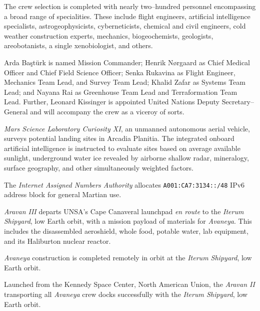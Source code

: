 The crew selection is completed with nearly two--hundred personnel encompassing a broad range of specialities. These include flight engineers, artificial intelligence specialists, astrogeophysicists, cyberneticists, chemical and civil engineers, cold weather construction experts, mechanics, biogeochemists, geologists, areobotanists, a single xenobiologist, and others.

Arda Baştürk is named Mission Commander; Henrik Nørgaard as Chief Medical Officer and Chief Field Science Officer; Senka Rukavina as Flight Engineer, Mechanics Team Lead, and Survey Team Lead; Khalid Zafar as Systems Team Lead; and Nayana Rai as Greenhouse Team Lead and Terraformation Team Lead. Further, Leonard Kissinger is appointed United Nations Deputy Secretary--General and will accompany the crew as a viceroy of sorts.
\StopTimelineDate

{\it Mars Science Laboratory Curiosity XI}, an unmanned autonomous aerial vehicle, surveys potential landing sites in Arcadia Planitia. The integrated onboard artificial intelligence is instructed to evaluate sites based on average available sunlight, underground water ice revealed by airborne shallow radar, mineralogy, surface geography, and other simultaneously weighted factors.
\StopTimelineDate

The {\it Internet Assigned Numbers Authority} allocates {\tt A001:CA7:3134::/48} IPv6 address block for general Martian use. 
\StopTimelineDate

{\it Aravan III} departs UNSA's Cape Canaveral launchpad {\it en route} to the {\it Iterum Shipyard}, low Earth orbit, with a mission payload of materials for {\it Avaneya}. This includes the disassembled aeroshield, whole food, potable water, lab equipment, and its Haliburton nuclear reactor.
\StopTimelineDate

{\it Avaneya} construction is completed remotely in orbit at the {\it Iterum Shipyard}, low Earth orbit.
\StopTimelineDate

Launched from the Kennedy Space Center, North American Union, the {\it Aravan II} transporting all {\it Avaneya} crew docks successfully with the {\it Iterum Shipyard}, low Earth orbit.
\StopTimelineDate

